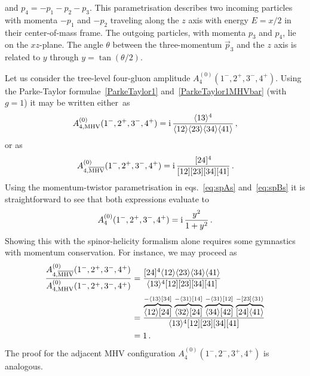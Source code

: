 and $p_4 = -p_1-p_2-p_3$. This parametrisation describes two incoming particles with momenta $-p_1$ and $-p_2$ traveling along the $z$ axis with energy $E = x/2$ in their center-of-mass frame. The outgoing particles, with momenta $p_3$ and $p_4$, lie on the $xz$-plane. The angle $\theta$ between the three-momentum $\vec{p}_3$ and the $z$ axis is related to $y$ through $y = \tan(\theta/2)$.

\smallskip

Let us consider the tree-level four-gluon amplitude $A^{(0)}_4(1^-,2^+,3^-, \allowbreak 4^+)$. Using the Parke-Taylor formulae~\eqref{ParkeTaylor1} and~\eqref{ParkeTaylor1MHVbar} (with $g=1$) it may be written either~as
\begin{align}
A^{(0)}_{4, \mathrm{MHV}}(1^-,2^+,3^-,4^+) = \mathrm{i} \, \frac{\langle 13 \rangle^4 }{\langle 1 2 \rangle \langle 2 3 \rangle \langle 3 4 \rangle \langle 4 1 \rangle} \,,
\end{align}
or as
\begin{align}
A^{(0)}_{4, \overline{\mathrm{MHV}}}(1^-,2^+,3^-,4^+) = \mathrm{i} \, \frac{[ 24]^4 }{[12] [23] [34] [41]} \,.
\end{align}
Using the momentum-twistor parametrisation in eqs.~\eqref{eq:spAs} and~\eqref{eq:spBs} it is straightforward to see that both expressions evaluate to
\begin{align}
A^{(0)}_4(1^-,2^+,3^-,4^+) = \mathrm{i} \, \frac{y^2}{1+y^2} \,.
\end{align}
Showing this with the spinor-helicity formalism alone requires some gymnastics with momentum conservation. For instance, we may proceed as 
\begin{align}
\frac{A^{(0)}_{4,  \overline{\mathrm{MHV}}}(1^-,2^+,3^-,4^+)}{A^{(0)}_{4, \mathrm{MHV}}(1^-,2^+,3^-,4^+)} & = \frac{[24]^4 \langle 1 2 \rangle \langle 2 3 \rangle \langle 3 4 \rangle \langle 4 1 \rangle}{\langle 13 \rangle^4 [12] [23] [34] [41] } \nonumber \\
& = \frac{\overbrace{\langle 1 2 \rangle [24]}^{- \langle 1 3 \rangle [34]} \, \overbrace{\langle 3 2 \rangle [24]}^{- \langle 3 1 \rangle [14]} \, \overbrace{\langle 3 4 \rangle [42]}^{-\langle 3 1 \rangle [12]} \, \overbrace{[24] \langle 4 1 \rangle}^{-[23] \langle 3 1 \rangle}}{\langle 13 \rangle^4 [12] [23] [34] [41] } \nonumber \\
& = 1 \,.
\end{align}
The proof for the adjacent MHV configuration $A^{(0)}_4(1^-,2^-,3^+, 4^+)$ is analogous.




